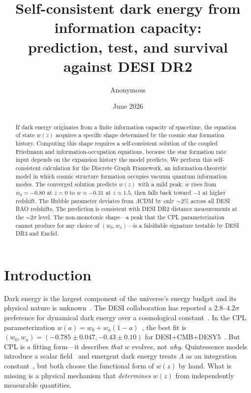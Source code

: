 \documentclass[12pt,a4paper]{article}
\begin{document}
\title{\bf Self-consistent dark energy from information capacity:\\prediction, test, and survival against DESI DR2}

\author{Anonymous}
\date{June 2026}

\maketitle

\begin{abstract}
If dark energy originates from a finite information capacity of spacetime, the equation of state $w(z)$ acquires a specific shape determined by the cosmic star formation history. Computing this shape requires a self-consistent solution of the coupled Friedmann and information-occupation equations, because the star formation rate input depends on the expansion history the model predicts. We perform this self-consistent calculation for the Discrete Graph Framework, an information-theoretic model in which cosmic structure formation occupies vacuum quantum information modes. The converged solution predicts $w(z)$ with a mild peak: $w$ rises from $w_0=-0.80$ at $z=0$ to $w\approx-0.31$ at $z\approx1.5$, then falls back toward $-1$ at higher redshift. The Hubble parameter deviates from $\Lambda$CDM by only $\sim$2\% across all DESI BAO redshifts. The prediction is consistent with DESI DR2 distance measurements at the $\sim$2$\sigma$ level. The non-monotonic shape---a peak that the CPL parameterization cannot produce for any choice of $(w_0,w_a)$---is a falsifiable signature testable by DESI DR3 and Euclid.
\end{abstract}

\section*{Introduction}

Dark energy is the largest component of the universe's energy budget and its physical nature is unknown~\cite{riess1998,spergel2003}. The DESI collaboration has reported a $2.8$--$4.2\sigma$ preference for dynamical dark energy over a cosmological constant~\cite{desi2025}. In the CPL parameterization $w(a)=w_0+w_a(1-a)$~\cite{chevallier2001}, the best fit is $(w_0,w_a)=(-0.785\pm0.047,-0.43\pm0.10)$ for DESI+CMB+DESY5~\cite{li2026}. But CPL is a fitting form---it describes {\it that} $w$ evolves, not {\it why}. Quintessence models introduce a scalar field~\cite{tsujikawa2013} and emergent dark energy treats $\Lambda$ as an integration constant~\cite{li2024}, but both choose the functional form of $w(z)$ by hand. What is missing is a physical mechanism that {\it determines} $w(z)$ from independently measurable quantities.
\end{document}
